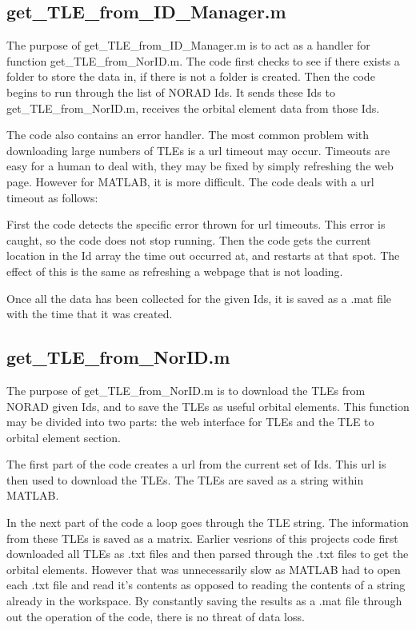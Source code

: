 \documentclass[12pt]{article}
\begin{document}
		\subsection{get\_TLE\_from\_ID\_Manager.m}
		The purpose of get\_TLE\_from\_ID\_Manager.m is to act as a handler for function \newline get\_TLE\_from\_NorID.m. The code first checks to see if there exists a folder to store the data in, if there is not a folder is created. Then the code begins to run through the list of NORAD Ids. It sends these Ids to get\_TLE\_from\_NorID.m, receives the orbital element data from those Ids. 
		
		The code also contains an error handler. The most common problem with downloading large numbers of TLEs is a url timeout may occur. Timeouts are easy for a human to deal with, they may be fixed by simply refreshing the web page. However for MATLAB, it is more difficult. The code deals with a url timeout as follows:
		
		First the code detects the specific error thrown for url timeouts. This error is caught, so the code does not stop running. Then the code gets the current location in the Id array the time out occurred at, and restarts at that spot. The effect of this is the same as refreshing a webpage that is not loading. 
		
		Once all the data has been collected for the given Ids, it is saved as a .mat file with the time that it was created.
		\subsection{get\_TLE\_from\_NorID.m}
		The purpose of get\_TLE\_from\_NorID.m is to download the TLEs from NORAD given Ids, and to save the TLEs as useful orbital elements. This function may be divided into two parts: the web interface for TLEs and the TLE to orbital element section. 
		
		The first part of the code creates a url from the current set of Ids. This url is then used to download the TLEs. The TLEs are saved as a string within MATLAB.  
		
		In the next part of the code a loop goes through the TLE string. The information from these TLEs is saved as a matrix. Earlier vesrions of this projects code first downloaded all TLEs as .txt files and then parsed through the .txt files to get the orbital elements. However that was unnecessarily slow as MATLAB had to open each .txt file and read it's contents as opposed to reading the contents of a string already in the workspace. By constantly saving the results as a .mat file through out the operation of the code, there is no threat of data loss. 
		
\end{document}

